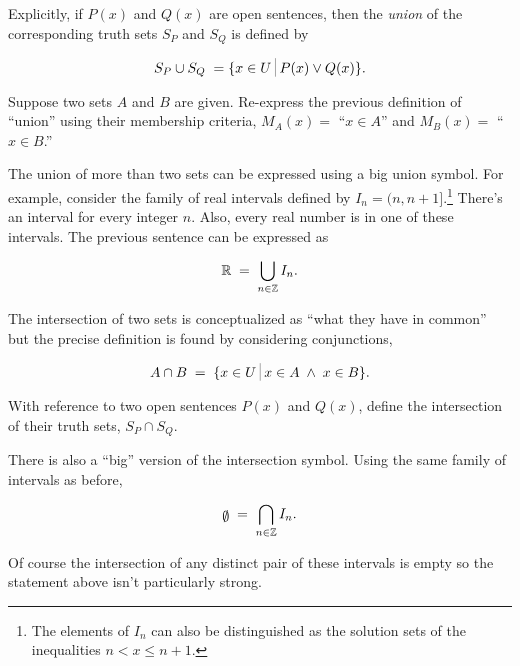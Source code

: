 Explicitly, if $P(x)$ and $Q(x)$ are open sentences, then
the \emph{union} of the corresponding truth sets $S_P$ and $S_Q$
is defined by 

\[ S_P \cup S_Q \; = \{ x \in U \suchthat P(x) \lor Q(x) \}. \]

\begin{exer}
Suppose two sets $A$ and $B$ are given.  Re-express the previous
definition of ``union'' using their membership criteria, $M_A(x) =$
``$x \in A$'' and $M_B(x) = $ ``$x \in B$.''
\end{exer}

The union of more than two sets can be expressed using a big union
symbol.  For example, consider the family of real intervals defined
by $I_n = (n,n+1]$.\footnote{The elements %
of $I_n$ can also be distinguished as the solution sets of %
the inequalities $n < x \leq n+1$.}    
There's an interval for every integer $n$.  Also, every real number is in
one of these intervals.  The previous sentence can be expressed as

\[ {\mathbb R} \; = \; \bigcup_{n\in{\mathbb Z}} I_n. \]

The intersection of two sets is conceptualized as ``what they have in common''
but the precise definition is found by considering conjunctions,  

\[ A \cap B \; = \; \{ x \in U \suchthat x \in A \; \land \; x \in B \}. \]

\begin{exer} 
With reference to two open sentences $P(x)$ and $Q(x)$, define the
intersection of their truth sets, $S_P \cap S_Q$.
\end{exer}

There is also a ``big'' version of the intersection symbol.  Using 
the same family of intervals as before, 

\[ \mbox{\raisebox{-2pt}{$\emptyset$}} \; = \; \bigcap_{n\in\Integers} I_n. \]

Of course the intersection of any distinct pair of these intervals is empty
so the statement above isn't particularly strong.

